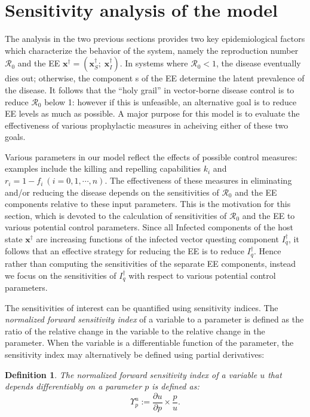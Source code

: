 \documentclass[a4paper]{article}
\newtheorem{dfn}{Definition}[section]
\begin{document}
\section{Sensitivity analysis of the model}\label{sec:secsam}

The analysis in the two previous sections provides two key epidemiological factors which characterize the behavior of the system, namely the reproduction number $\mathcal R_0$ and the EE  $\mathbf x^\dagger  = (\mathbf x_S^\dagger ;\;\mathbf x_I^\dagger )$. In systems where $\mathcal R_0<1$, the disease eventually dies out; otherwise, the component s of the EE  determine the latent prevalence of the disease. 
It follows that the ``holy grail'' in vector-borne disease control is to reduce $\mathcal R_0$ below 1: however if this is unfeasible, an alternative goal is to reduce EE levels as much as possible. A major purpose for this model is to evaluate the effectiveness of various  prophylactic measures in acheiving either of these two goals.

Various parameters in our model reflect the effects of possible control measures: examples include the killing and repelling capabilities $k_i$ and $r_i = 1-f_i~(i=0,1, \cdots, n)$.
The effectiveness of these measures  in eliminating and/or reducing the disease depends on  the sensitivities of $\mathcal R_0$ and the EE components relative to these input parameters.  This is the motivation for this section, which is devoted to the calculation of  sensitivities of $\mathcal R_0$ and the EE to various potential control parameters.  Since  all Infected components of the host state $\mathbf x^\dagger $  are increasing functions of the infected vector questing component $I_q^\dagger $, 
it follows that an effective strategy for reducing the EE is to reduce  $I^\dagger _q$.  Hence rather than computing the sensitivities of the separate EE components, instead we focus on the sensitivities of $I^\dagger _q$ with respect to various potential control parameters.

The sensitivities of interest  can be quantified using sensitivity indices. The \textit{normalized forward sensitivity index}  of a variable to a parameter is defined as the ratio of the relative change in the variable to the relative change in the parameter. When the variable is a differentiable function of the parameter, the sensitivity index may alternatively be defined using partial derivatives:
\begin{dfn} The normalized forward sensitivity index of a variable $u$ that depends differentiably on a parameter $p$ is defined as:
	\begin{equation}
	\label{eq:seind}
	\varUpsilon_p^u := \frac{\partial u}{\partial p}\times\frac{p}{u}.\end{equation}
\end{dfn}
\end{document}
